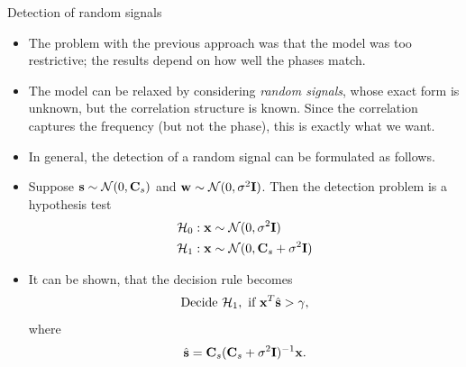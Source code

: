 \documentclass[10pt, aspectratio=169]{beamer} %
\newcommand{\w}{{\bf w}}
\newcommand{\s}{{\bf s}}
\newcommand{\x}{{\bf x}}
\begin{document}
\begin{frame}[allowframebreaks=0.8]
 {Detection of random signals}
\begin{itemize}
\item The problem with the previous approach was that the model was too
restrictive; the results depend on how well the phases match.
\item The model can be relaxed by considering \emph{random signals},
whose exact form is unknown, but the correlation structure is known.
Since the correlation captures the frequency (but not the phase),
this is exactly what we want.
\item In general, the detection of a random signal can be formulated as
follows.
\item Suppose $\s \sim {\cal N}(0, {\bf C}_s)$ and $\w \sim {\cal N}(0, \sigma^2 {\bf I})$.
Then the detection problem is a hypothesis test
\begin{align*}
{\cal H}_0&:  \x\sim{\cal N}(0, \sigma^2 {\bf I})\\
{\cal H}_1&:  \x\sim{\cal N}(0, {\bf C}_s + \sigma^2 {\bf I})
\end{align*}
\item It can be shown, that the decision rule becomes
\[
\text{Decide } {\cal H}_1, \text{ if } \x^T\hat{\s} > \gamma,
\]
where
\[
\hat{\s} = {\bf C}_s({\bf C}_s + \sigma^2 {\bf I})^{-1}\x.
\]
\end{itemize}
\end{frame}
\end{document}
